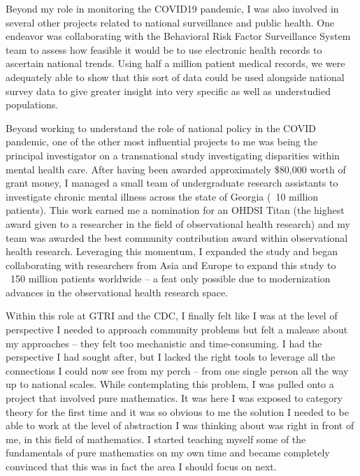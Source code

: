 \documentclass[11pt]{extarticle}
\begin{document}
Beyond my role in monitoring the COVID19 pandemic, I was also involved in several other projects related to national surveillance and public health.
One endeavor was collaborating with the Behavioral Risk Factor Surveillance System team to assess how feasible it would be to use electronic health records to ascertain national trends.
Using half a million patient medical records, we were adequately able to show that this sort of data could be used alongside national survey data to give greater insight into very specific as well as understudied populations.

Beyond working to understand the role of national policy in the COVID pandemic, one of the other most influential projects to me was being the principal investigator on a transnational study investigating disparities within mental health care.
After having been awarded approximately \$80,000 worth of grant money, I managed a small team of undergraduate research assistants to investigate chronic mental illness across the state of Georgia (~10 million patients).
This work earned me a nomination for an OHDSI Titan (the highest award given to a researcher in the field of observational health research) and my team was awarded the best community contribution award within observational health research.
Leveraging this momentum, I expanded the study and began collaborating with researchers from Asia and Europe to expand this study to ~150 million patients worldwide -- a feat only possible due to modernization advances in the observational health research space.

Within this role at GTRI and the CDC, I finally felt like I was at the level of perspective I needed to approach community problems but felt a malease about my approaches -- they felt too mechanistic and time-consuming. 
I had the perspective I had sought after, but I lacked the right tools to leverage all the connections I could now see from my perch -- from one single person all the way up to national scales.
While contemplating this problem, I was pulled onto a project that involved pure mathematics.
It was here I was exposed to category theory for the first time and it was so obvious to me the solution I needed to be able to work at the level of abstraction I was thinking about was right in front of me, in this field of mathematics.
I started teaching myself some of the fundamentals of pure mathematics on my own time and became completely convinced that this was in fact the area I should focus on next.
\end{document}
